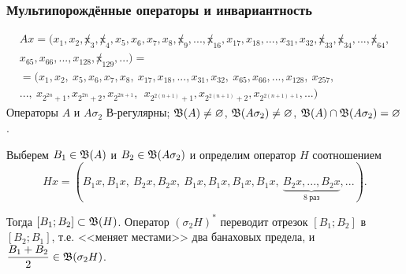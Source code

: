 \begin{frame}\frametitle{{Мультипорождённые операторы и инвариантность}}
	\begin{multline}
		Ax = (x_1, x_2, \not x_3, \not x_4, x_5, x_6, x_7, x_8, \not x_9, ..., \not x_{16}, x_{17}, x_{18}, ..., x_{31}, x_{32}, \not x_{33}, \not x_{34}, ..., \not x_{64},
		\\
		x_{65}, x_{66}, ..., x_{128}, \not x_{129}, ...)=
		\\=
		(x_1, x_2, \ x_5, x_6, x_7, x_8, \ x_{17}, x_{18}, ..., x_{31}, x_{32}, \ x_{65}, x_{66}, ..., x_{128}, \ x_{257},
		\\
		..., \ x_{2^{2n} +1}, x_{2^{2n} +2},  x_{2^{2n+1}}, \ \ x_{2^{2(n+1)} +1},  x_{2^{2(n+1)} +2},  x_{2^{2(n+1)+1}}, ...)
	\end{multline}
	Операторы $A$ и $A\sigma_2$ В-регулярны; $\mathfrak{B}(A) \ne\varnothing$, $\mathfrak{B}(A\sigma_2) \ne\varnothing$,
	$\mathfrak{B}(A) \cap \mathfrak{B}(A\sigma_2) =\varnothing$.

	\vfill

	Выберем $B_1 \in \mathfrak{B} (A)$ и $B_2 \in \mathfrak{B}(A\sigma_2)$ и определим оператор $H$ соотношением
	\begin{equation}
		Hx = (B_1 x, B_1 x, \ B_2 x, B_2 x, \ B_1 x, B_1 x, B_1 x, B_1 x, \ \underbrace{B_2 x, ..., B_2 x}_{8~\mbox{раз}}, ...)
		.
	\end{equation}

	Тогда $[B_1; B_2]\subset \mathfrak{B}(H)$.
	Оператор $(\sigma_2 H)^*$ переводит отрезок $[B_1; B_2]$ в $[B_2; B_1]$,
	т.е. <<меняет местами>> два банаховых предела,
	и $\dfrac{B_1 + B_2}2 \in \mathfrak{B}(\sigma_2 H)$.
\end{frame}

